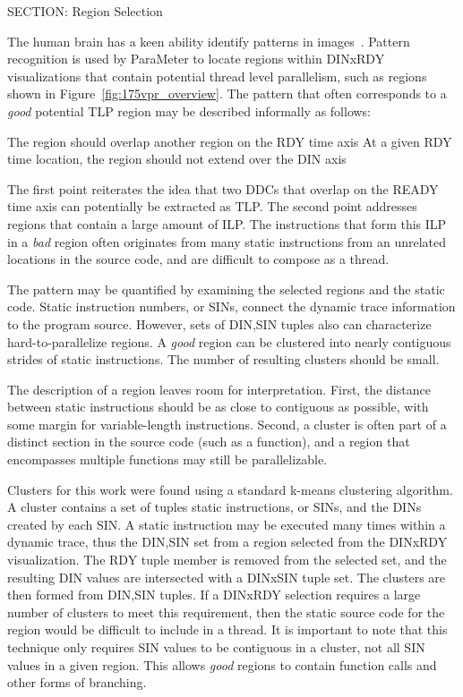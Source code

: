 {SECTION: Region Selection


The human brain has a keen ability identify patterns in images~\cite{biederman:87:pr}. Pattern recognition is used by ParaMeter to locate regions within DINxRDY visualizations that contain potential thread level parallelism, such as regions shown in Figure~\ref{fig:175vpr_overview}. The pattern that often corresponds to a \textit{good} potential TLP region may be described informally as follows:

 The region should overlap another region on the RDY time axis
 At a given RDY time location, the region should not extend over
 the DIN axis

The first point reiterates the idea that two DDCs that overlap on the READY time axis can potentially be extracted as TLP.  The second point addresses regions that contain a large amount of ILP.  The instructions that form this ILP in a \textit{bad} region often originates from many static instructions from an unrelated locations in the source code, and are difficult to compose as a thread.

The pattern may be quantified by examining the selected regions and the static code.  Static instruction numbers, or SINs, connect the dynamic trace information to the program source.  However, sets of {DIN,SIN} tuples also can characterize hard-to-parallelize regions. A \textit{good} region can be clustered into nearly contiguous strides of static instructions. The number of resulting clusters should be small.

The description of a  region leaves room for interpretation.  First, the distance between static instructions should be as close to contiguous as possible, with some margin for variable-length instructions. Second, a cluster is often part of a distinct section in the source code (such as a function), and a region that encompasses multiple functions may still be parallelizable.

Clusters for this work were found using a standard k-means clustering algorithm.  A cluster contains a set of tuples static instructions, or SINs, and the DINs created by each SIN.  A static instruction may be executed many times within a dynamic trace, thus the {DIN,SIN} set from a region selected from the DINxRDY visualization. The RDY tuple member is removed from the selected set, and the resulting DIN values are intersected with a DINxSIN tuple set.  The clusters are then formed from {DIN,SIN} tuples.  If a DINxRDY selection requires a large number of clusters to meet this requirement, then the static source code for the region would be difficult to include in a thread.  It is important to note that this technique only requires SIN values to be contiguous in a cluster, not all SIN values in a given region.  This allows \textit{good} regions to contain function calls and other forms of branching.

}
